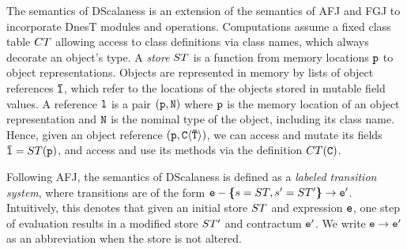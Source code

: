 The semantics of DScalaness is an extension of the semantics of AFJ and FGJ to incorporate DnesT
modules and operations. Computations assume a fixed class table $\CT$ allowing access to class
definitions via class names, which always decorate an object's type. A \emph{store} $\jstore$ is
a function from memory locations $\tt{p}$ to object representations. Objects are represented in
memory by lists of object references $\ttvec{l}$, which refer to the locations of the objects
stored in mutable field values. A reference $\tt{l}$ is a pair $\jref{\tt{p}}{N}$ where $\tt{p}$
is the memory location of an object representation and $\tt{N}$ is the nominal type of the
object, including its class name. Hence, given an object reference
$\jref{\tt{p}}{\jinst{C}{\ttvec{T}}}$, we can access and mutate its fields $\ttvec{l} =
\jstore(\tt{p})$, and access and use its methods via the definition $\CT(\tt{C})$.

Following AFJ, the semantics of DScalaness is defined as a \emph{labeled transition system},
where transitions are of the form $\tt{e} - \lc s = \jstore, s' = \jstore' \rc \rightarrow
\tt{e}' $. Intuitively, this denotes that given an initial store $\jstore$ and expression
$\tt{e}$, one step of evaluation results in a modified store $\jstore'$ and contractum
$\tt{e}'$. We write $\tt{e} \rightarrow \tt{e}'$ as an abbreviation when the store is not
altered.

